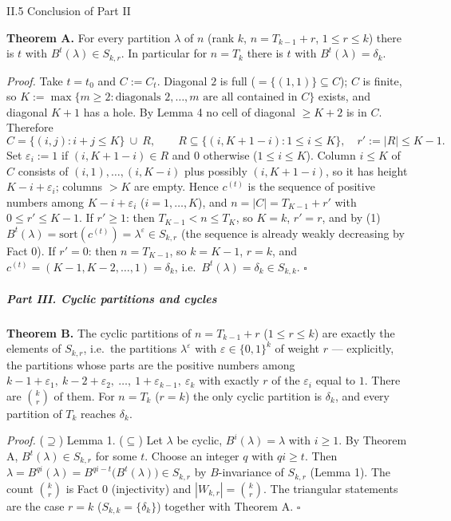 \documentclass[11pt,a4paper]{article}
\begin{document}
II.5 Conclusion of Part II

\textbf{Theorem A.} For every partition \(\lambda\) of \(n\) (rank
\(k\), \(n=T_{k-1}+r\), \(1\le r\le k\)) there is \(t\) with
\(B^t(\lambda)\in S_{k,r}\). In particular for \(n=T_k\) there is \(t\)
with \(B^t(\lambda)=\delta_k\).

\emph{Proof.} Take \(t=t_0\) and \(C:=C_{t}\). Diagonal \(2\) is full
(\(=\{(1,1)\}\subseteq C\)); \(C\) is finite, so
\(K:=\max\{m\ge2:\text{diagonals }2,\dots,m\text{ are all contained in }C\}\)
exists, and diagonal \(K+1\) has a hole. By Lemma 4 no cell of diagonal
\(\ge K+2\) is in \(C\). Therefore
\[C=\{(i,j):i+j\le K\}\ \cup\ R,\qquad R\subseteq\{(i,K+1-i):1\le i\le K\},\quad r':=|R|\le K-1.\]
Set \(\varepsilon_i:=1\) if \((i,K+1-i)\in R\) and \(0\) otherwise
(\(1\le i\le K\)). Column \(i\le K\) of \(C\) consists of
\((i,1),\dots,(i,K-i)\) plus possibly \((i,K+1-i)\), so it has height
\(K-i+\varepsilon_i\); columns \(>K\) are empty. Hence \(c^{(t)}\) is
the sequence of positive numbers among \(K-i+\varepsilon_i\)
(\(i=1,\dots,K\)), and \(n=|C|=T_{K-1}+r'\) with \(0\le r'\le K-1\). If
\(r'\ge1\): then \(T_{K-1}<n\le T_K\), so \(K=k\), \(r'=r\), and by (1)
\(B^t(\lambda)=\mathrm{sort}(c^{(t)})=\lambda^\varepsilon\in S_{k,r}\)
(the sequence is already weakly decreasing by Fact 0). If \(r'=0\): then
\(n=T_{K-1}\), so \(k=K-1\), \(r=k\), and
\(c^{(t)}=(K-1,K-2,\dots,1)=\delta_k\),
i.e.~\(B^t(\lambda)=\delta_k\in S_{k,k}\). \(\square\)

\subparagraph{Part III. Cyclic partitions and
cycles}\label{part-iii.-cyclic-partitions-and-cycles}

\textbf{Theorem B.} The cyclic partitions of \(n=T_{k-1}+r\)
(\(1\le r\le k\)) are exactly the elements of \(S_{k,r}\), i.e.~the
partitions \(\lambda^\varepsilon\) with \(\varepsilon\in\{0,1\}^k\) of
weight \(r\) --- explicitly, the partitions whose parts are the positive
numbers among
\(k-1+\varepsilon_1,\ k-2+\varepsilon_2,\ \dots,\ 1+\varepsilon_{k-1},\ \varepsilon_k\)
with exactly \(r\) of the \(\varepsilon_i\) equal to \(1\). There are
\(\binom kr\) of them. For \(n=T_k\) (\(r=k\)) the only cyclic partition
is \(\delta_k\), and every partition of \(T_k\) reaches \(\delta_k\).

\emph{Proof.} (\(\supseteq\)) Lemma 1. (\(\subseteq\)) Let \(\lambda\)
be cyclic, \(B^i(\lambda)=\lambda\) with \(i\ge1\). By Theorem A,
\(B^t(\lambda)\in S_{k,r}\) for some \(t\). Choose an integer \(q\) with
\(qi\ge t\). Then
\(\lambda=B^{qi}(\lambda)=B^{qi-t}\big(B^t(\lambda)\big)\in S_{k,r}\) by
\(B\)-invariance of \(S_{k,r}\) (Lemma 1). The count \(\binom kr\) is
Fact 0 (injectivity) and \(|W_{k,r}|=\binom kr\). The triangular
statements are the case \(r=k\) (\(S_{k,k}=\{\delta_k\}\)) together with
Theorem A. \(\square\)
\end{document}
